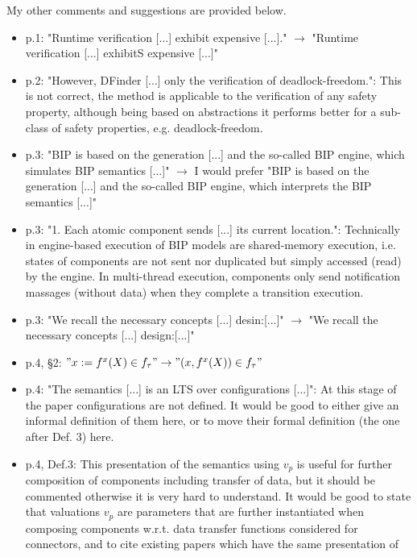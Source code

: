 

My other comments and suggestions are provided below.

\begin{itemize}
\item p.1: "Runtime verification [...] exhibit expensive [...]." $\rightarrow$ "Runtime 
verification [...] exhibitS expensive [...]"
\done
\item p.2: "However, DFinder [...] only the verification of deadlock-freedom.": 
This is not correct, the method is applicable to the verification of any 
safety property, although being based on abstractions it performs better for 
a sub-class of safety properties, e.g. deadlock-freedom.
\item p.3: "BIP is based on the generation [...] and the so-called BIP engine, 
which simulates BIP semantics [...]" $\rightarrow$ I would prefer "BIP is based on the 
generation [...] and the so-called BIP engine, which interprets the BIP 
semantics [...]"
\item p.3: "1. Each atomic component sends [...] its current location.": 
Technically in engine-based execution of BIP models are shared-memory 
execution, i.e. states of components are not sent nor duplicated but simply 
accessed (read) by the engine. In multi-thread execution, components only 
send notification massages (without data) when they complete a transition 
execution.
\item p.3: "We recall the necessary concepts [...] desin:[...]" $\rightarrow$ "We recall the 
necessary concepts [...] design:[...]"
\item p.4, §2: $"x := f^x(X) \in f_{\tau}" \rightarrow "(x,f^x(X)) \in f_{\tau}"$
\item p.4: "The semantics [...] is an LTS over configurations [...]": At this 
stage of the paper configurations are not defined. It would be good to either 
give an informal definition of them here, or to move their formal definition 
(the one after Def. 3) here.
\item p.4, Def.3: This presentation of the semantics using $v_p$ is useful for 
further composition of components including transfer of data, but it should 
be commented otherwise it is very hard to understand. It would be good to 
state that valuations $v_p$ are parameters that are further instantiated when 
composing components w.r.t. data transfer functions considered for 
connectors, and to cite existing papers which have the same presentation of 

\end{itemize}
